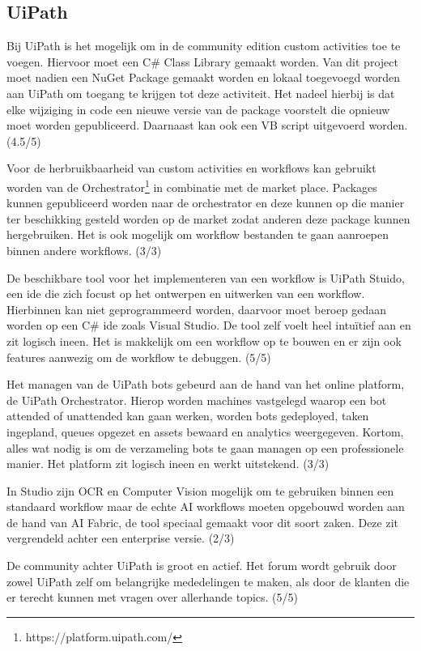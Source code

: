 \subsection{UiPath}
Bij UiPath is het mogelijk om in de community edition custom activities toe te voegen. Hiervoor moet een C\# Class Library gemaakt worden. Van dit project moet nadien een NuGet Package gemaakt worden en lokaal toegevoegd worden aan UiPath om toegang te krijgen tot deze activiteit. Het nadeel hierbij is dat elke wijziging in code een nieuwe versie van de package voorstelt die opnieuw moet worden gepubliceerd. Daarnaast kan ook een VB script uitgevoerd worden. (4.5/5)

Voor de herbruikbaarheid van custom activities en workflows kan gebruikt worden van de Orchestrator\footnote{https://platform.uipath.com/} in combinatie met de market place. Packages kunnen gepubliceerd worden naar de orchestrator en deze kunnen op die manier ter beschikking gesteld worden op de market zodat anderen deze package kunnen hergebruiken. Het is ook mogelijk om workflow bestanden te gaan aanroepen binnen andere workflows. (3/3) 

De beschikbare tool voor het implementeren van een workflow is UiPath Stuido, een ide die zich focust op het ontwerpen en uitwerken van een workflow. Hierbinnen kan niet geprogrammeerd worden, daarvoor moet beroep gedaan worden op een C\# ide zoals Visual Studio. De tool zelf voelt heel intuïtief aan en zit logisch ineen. Het is makkelijk om een workflow op te bouwen en er zijn ook features aanwezig om de workflow te debuggen. (5/5)

Het managen van de UiPath bots gebeurd aan de hand van het online platform, de UiPath Orchestrator. Hierop worden machines vastgelegd waarop een bot attended of unattended kan gaan werken, worden bots gedeployed, taken ingepland, queues opgezet en assets bewaard en analytics weergegeven. Kortom, alles wat nodig is om de verzameling bots te gaan managen op een professionele manier. Het platform zit logisch ineen en werkt uitstekend. (3/3)

In Studio zijn OCR en Computer Vision mogelijk om te gebruiken binnen een standaard workflow maar de echte AI workflows moeten opgebouwd worden aan de hand van AI Fabric, de tool speciaal gemaakt voor dit soort zaken. Deze zit vergrendeld achter een enterprise versie. (2/3)

De community achter UiPath is groot en actief. Het forum wordt gebruik door zowel UiPath zelf om belangrijke mededelingen te maken, als door de klanten die er terecht kunnen met vragen over allerhande topics. (5/5)

